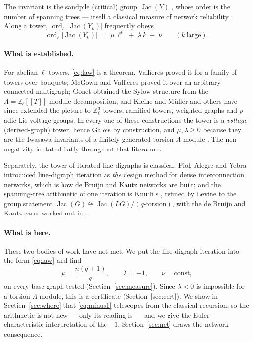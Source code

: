 \documentclass[11pt]{article}
\theoremstyle{plain}
\theoremstyle{remark}
\newcommand{\Z}{\mathbb{Z}}
\newcommand{\Zl}{\Z_\ell}
\newcommand{\Jac}{\operatorname{Jac}}
\newcommand{\ord}{\operatorname{ord}}
\newcommand{\La}{\Lambda}
\begin{document}
The invariant is the sandpile (critical) group $\Jac(Y)$ \cite{Biggs}, whose order is the
number of spanning trees --- itself a classical measure of network reliability
\cite{Boesch86,Colbourn87,BH09}. Along a tower, $\ord_\ell|\Jac(Y_k)|$ frequently obeys
\begin{equation}\label{eq:law}
\ord_\ell\bigl|\Jac(Y_k)\bigr|\;=\;\mu\,\ell^{k}\;+\;\lambda\,k\;+\;\nu
\qquad(k\ \text{large}).
\end{equation}

\paragraph{What is established.}
For abelian $\ell$-towers, \eqref{eq:law} is a theorem. Vall\`ieres \cite{Val21} proved it
for a family of towers over bouquets; McGown and Vall\`ieres \cite{MV24} proved it over an
arbitrary connected multigraph; Gonet \cite{Gonet22} obtained the Sylow structure from the
$\La=\Zl[[T]]$-module decomposition, and Kleine and M\"uller \cite{KM24} and others have
since extended the picture to $\Zl^{d}$-towers, ramified towers, weighted graphs and
$p$-adic Lie voltage groups. In every one of these constructions the tower is a
\emph{voltage} (derived-graph) tower, hence Galois by construction, and
$\mu,\lambda\ge0$ because they are the Iwasawa invariants of a finitely generated torsion
$\La$-module \cite{Washington}. The non-negativity is stated flatly throughout that
literature.

Separately, the tower of iterated line digraphs is classical. Fiol, Alegre and Yebra
\cite{FAY83,FYA84} introduced line-digraph iteration as \emph{the} design method for dense
interconnection networks, which is how de Bruijn and Kautz networks are built; and the
spanning-tree arithmetic of one iteration is Knuth's \cite{Knuth67}, refined by Levine
\cite{Levine11} to the group statement $\Jac(G)\cong\Jac(LG)/(\text{$q$-torsion})$, with the
de Bruijn and Kautz cases worked out in \cite{BK11,CHP15}.

\paragraph{What is here.}
These two bodies of work have not met. We put the line-digraph iteration into the form
\eqref{eq:law} and find
\begin{equation}\label{eq:minus1}
\mu=\frac{n(q+1)}{q},\qquad \lambda=-1,\qquad \nu=\text{const},
\end{equation}
on every base graph tested (Section~\ref{sec:measure}). Since $\lambda<0$ is impossible for
a torsion $\La$-module, this is a certificate (Section~\ref{sec:cert}). We show in
Section~\ref{sec:where} that \eqref{eq:minus1} telescopes from the classical recursion, so
the arithmetic is not new --- only its reading is --- and we give the Euler-characteristic
interpretation of the $-1$. Section~\ref{sec:net} draws the network consequence.
\end{document}
